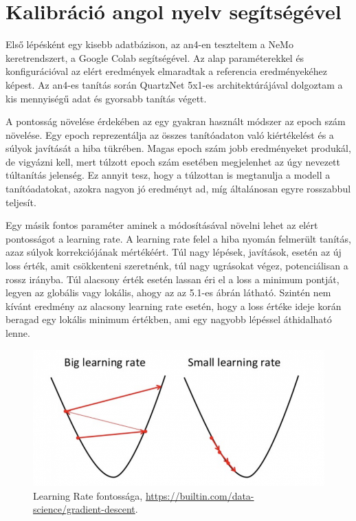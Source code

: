 \section{Kalibráció angol nyelv segítségével}

Első lépésként egy kisebb adatbázison, az an4-en teszteltem a NeMo keretrendszert, a Google Colab segítségével. Az alap paraméterekkel és konfigurációval az elért eredmények elmaradtak a referencia eredményekéhez képest. Az an4-es tanítás során QuartzNet 5x1-es architektúrájával dolgoztam a kis mennyiségű adat és gyorsabb tanítás végett.

A pontosság növelése érdekében az egy gyakran használt módszer az epoch szám növelése. Egy epoch reprezentálja az összes tanítóadaton való kiértékelést és a súlyok javítását a hiba tükrében. Magas epoch szám jobb eredményeket produkál, de vigyázni kell, mert túlzott epoch szám esetében megjelenhet az úgy nevezett túltanítás jelenség. Ez annyit tesz, hogy a túlzottan is megtanulja a modell a tanítóadatokat, azokra nagyon jó eredményt ad, míg általánosan egyre rosszabbul teljesít.

Egy másik fontos paraméter aminek a módosításával növelni lehet az elért pontosságot a learning rate. A learning rate felel a hiba nyomán felmerült tanítás, azaz súlyok korrekciójának mértékéért. Túl nagy lépések, javítások, esetén az új loss érték, amit csökkenteni szeretnénk, túl nagy ugrásokat végez, potenciálisan a rossz irányba. Túl alacsony érték esetén lassan éri el a loss a minimum pontját, legyen az globális vagy lokális, ahogy az az 5.1-es ábrán látható. Szintén nem kívánt eredmény az alacsony learning rate esetén, hogy a loss értéke ideje korán beragad egy lokális minimum értékben, ami egy nagyobb lépéssel áthidalható lenne.

\begin{figure}[!ht]
\centering
\includegraphics[width=150mm, keepaspectratio]{figures/gradient-descent-learning-rate.png}
\caption{Learning Rate fontossága, \url{https://builtin.com/data-science/gradient-descent}.}
\end{figure}

